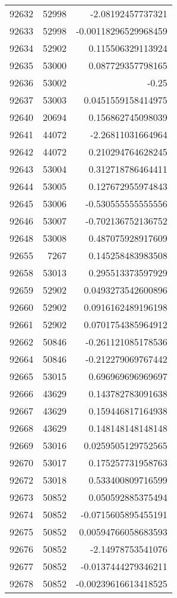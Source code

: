 \begin{tabular}{r | r | r}
92632 & 52998 & -2.08192457737321 \\
92633 & 52998 & -0.00118296529968459 \\
92634 & 52902 & 0.115506329113924 \\
92635 & 53000 & 0.087729357798165 \\
92636 & 53002 & -0.25 \\
92637 & 53003 & 0.0451559158414975 \\
92640 & 20694 & 0.156862745098039 \\
92641 & 44072 & -2.26811031664964 \\
92642 & 44072 & 0.210294764628245 \\
92643 & 53004 & 0.312718786464411 \\
92644 & 53005 & 0.127672955974843 \\
92645 & 53006 & -0.530555555555556 \\
92646 & 53007 & -0.702136752136752 \\
92648 & 53008 & 0.487075928917609 \\
92655 & 7267 & 0.145258483983508 \\
92658 & 53013 & 0.295513373597929 \\
92659 & 52902 & 0.0493273542600896 \\
92660 & 52902 & 0.0916162489196198 \\
92661 & 52902 & 0.0701754385964912 \\
92662 & 50846 & -0.261121085178536 \\
92664 & 50846 & -0.212279069767442 \\
92665 & 53015 & 0.696969696969697 \\
92666 & 43629 & 0.143782783091638 \\
92667 & 43629 & 0.159446817164938 \\
92668 & 43629 & 0.148148148148148 \\
92669 & 53016 & 0.0259505129752565 \\
92670 & 53017 & 0.175257731958763 \\
92672 & 53018 & 0.533400809716599 \\
92673 & 50852 & 0.050592885375494 \\
92674 & 50852 & -0.0715605895455191 \\
92675 & 50852 & 0.00594766058683593 \\
92676 & 50852 & -2.14978753541076 \\
92677 & 50852 & -0.0137444279346211 \\
92678 & 50852 & -0.00239616613418525 \\

\end{tabular}
